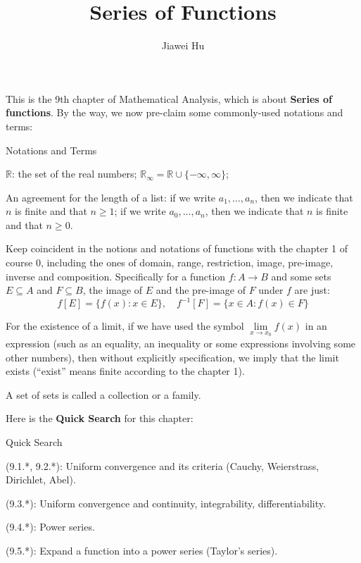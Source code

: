 \documentclass{article}
\title{\LARGE \textbf{Series of Functions}}
\author{\large Jiawei Hu}
\begin{document}
\maketitle

This is the 9th chapter of Mathematical Analysis, which is about \textbf{Series of functions}. By the way, we now pre-claim some commonly-used notations and terms:
\begin{Df}{Notations and Terms}
    \begin{compactenum}
        \item $\mathbb{R}$: the set of the real numbers; $\mathbb{R}_\infty = \mathbb{R}\cup\{-\infty, \infty\}$;
        \item An agreement for the length of a list: if we write $a_1, \dots, a_n$, then we indicate that $n$ is finite and that $n\geq 1$; if we write $a_0, \dots, a_n$, then we indicate that $n$ is finite and that $n\geq 0$.
        \item Keep coincident in the notions and notations of functions with the chapter 1 of course 0, including the ones of domain, range, restriction, image, pre-image, inverse and composition. Specifically for a function $f: A\rightarrow B$ and some sets $E\subseteq A$ and $F\subseteq B$, the image of $E$ and the pre-image of $F$ under $f$ are just:
        $$f[E] = \{f(x): x\in E\},\quad f^{-1}[F] = \{x\in A: f(x)\in F\}$$
        \item For the existence of a limit, if we have used the symbol $\lim\limits_{x\to x_0} f(x)$ in an expression (such as an equality, an inequality or some expressions involving some other numbers), then without explicitly specification, we imply that the limit exists (``exist'' means finite according to the chapter 1).
        \item A set of sets is called a collection or a family.
    \end{compactenum}
\end{Df}

Here is the \textbf{Quick Search} for this chapter:
\begin{Th}{Quick Search}
    \begin{compactdesc}
        \item (9.1.*, 9.2.*): Uniform convergence and its criteria (Cauchy, Weierstrass, Dirichlet, Abel).
        \item (9.3.*): Uniform convergence and continuity, integrability, differentiability.
        \item (9.4.*): Power series.
        \item (9.5.*): Expand a function into a power series (Taylor's series).
    \end{compactdesc}
\end{Th}
\end{document}
